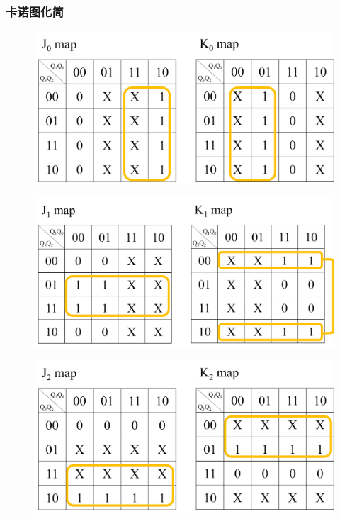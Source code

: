 \documentclass{article}
\begin{document}
\newpage

\subsubsection{卡诺图化简}

\begin{figure}[!hbp]
  \centering
  \includegraphics[scale=0.5]{3/k1.png}
\end{figure}

\begin{figure}[!hbp]
  \centering
  \includegraphics[scale=0.5]{3/k2.png}
\end{figure}

\newpage

\begin{figure}[!hbp]
  \centering
  \includegraphics[scale=0.5]{3/k3.png}
\end{figure}
\end{document}
